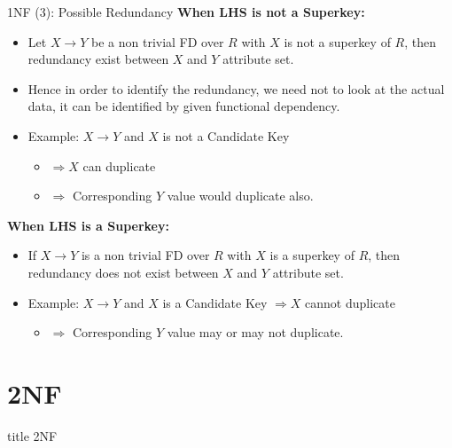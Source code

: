 \documentclass[aspectratio=169, xcolor=dvipsnames]{beamer}
\begin{document}
\begin{frame}{1NF (3): Possible Redundancy}
    \textbf{When LHS is not a Superkey:}
    \begin{itemize}[<+->]
        \item Let $X \rightarrow Y$ be a non trivial FD over $R$ with $X$ is not a superkey of $R$, then redundancy exist between $X$ and $Y$ attribute set.
        \item Hence in order to identify the redundancy, we need not to look at the actual data, it can be identified by given functional dependency.
        \item Example: $X \rightarrow Y$ and $X$ is not a Candidate Key
        \begin{itemize}
            \item[$\triangleright$] $\Rightarrow X$ can duplicate
            \item[$\triangleright$] $\Rightarrow$ Corresponding $Y$ value would duplicate also.
        \end{itemize}
    \end{itemize}
    \vspace{0.5em}
    \textbf{When LHS is a Superkey:}
    \begin{itemize}[<+(4)->]
        \item If $X \rightarrow Y$ is a non trivial FD over $R$ with $X$ is a superkey of $R$, then redundancy does not exist between $X$ and $Y$ attribute set.
        \item Example: $X \rightarrow Y$ and $X$ is a Candidate Key $\Rightarrow X$ cannot duplicate
        \begin{itemize}
            \item[$\triangleright$] $\Rightarrow$ Corresponding $Y$ value may or may not duplicate.
        \end{itemize}
    \end{itemize}
\end{frame}

\section{2NF}
\begin{frame}
  \vfill
  \centering
  \begin{beamercolorbox}[sep=8pt,center,shadow=true,rounded=true]{title}
    2NF\par%
  \end{beamercolorbox}
  \vfill
\end{frame}
\end{document}
